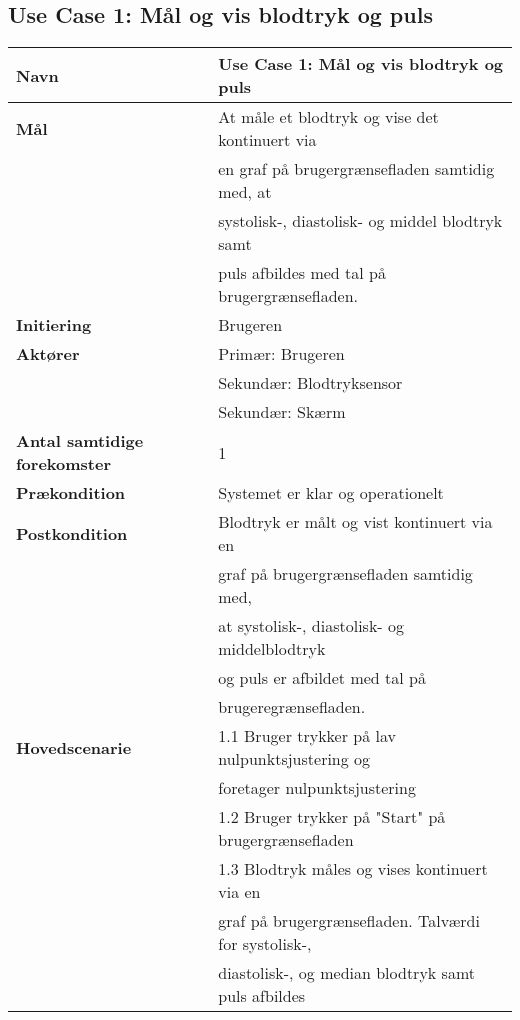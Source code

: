 \subsection{Use Case 1: Mål og vis blodtryk og puls}
\vspace{0.5 cm}
\begin{table}[h!]
	\begin{tabular}{l|l}
		\rowcolor[HTML]{A9D9F9} 
		\textbf{Navn} & Use Case 1: Mål og vis blodtryk og puls \\ \hline
		\textbf{Mål} & At måle et blodtryk og vise det kontinuert via \\
		& en graf på brugergrænsefladen samtidig med, at \\
		& systolisk-, diastolisk- og middel blodtryk samt \\
		& puls afbildes med tal på brugergrænsefladen. \\ \hline
		\rowcolor[HTML]{A9D9F9} 
		\textbf{Initiering} & Brugeren \\ \hline
		\textbf{Aktører} & Primær: Brugeren \\
		& Sekundær: Blodtryksensor \\
		& Sekundær: Skærm \\ \hline
		\rowcolor[HTML]{A9D9F9} 
		\textbf{Antal samtidige forekomster} & 1 \\ \hline
		\textbf{Prækondition} & Systemet er klar og operationelt \\ \hline
		\rowcolor[HTML]{A9D9F9} 
		\textbf{Postkondition} & Blodtryk er målt og vist kontinuert via en \\
		\rowcolor[HTML]{A9D9F9} 
		& graf på brugergrænsefladen samtidig med, \\
		\rowcolor[HTML]{A9D9F9} 
		& at systolisk-, diastolisk- og middelblodtryk \\
		\rowcolor[HTML]{A9D9F9} 
		& og puls er afbildet med tal på \\
		\rowcolor[HTML]{A9D9F9} 
		& brugeregrænsefladen. \\ \hline
		\textbf{Hovedscenarie} & 1.1 Bruger trykker på lav nulpunktsjustering og \\
		& foretager nulpunktsjustering \\
		& 1.2 Bruger trykker på "Start" på brugergrænsefladen \\
		& 1.3 Blodtryk måles og vises kontinuert via en \\
		& graf på brugergrænsefladen. Talværdi for systolisk-, \\
		& diastolisk-, og median blodtryk samt puls afbildes \\

\end{tabular}
\end{table}
